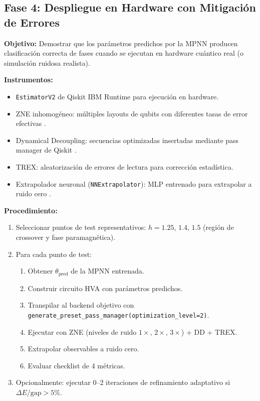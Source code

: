 \documentclass[11pt,a4paper,spanish]{book}
\begin{document}
\subsection{Fase 4: Despliegue en Hardware con Mitigación de Errores}

\textbf{Objetivo:} Demostrar que los parámetros predichos por la MPNN producen clasificación correcta de fases cuando se ejecutan en hardware cuántico real (o simulación ruidosa realista).

\textbf{Instrumentos:}
\begin{itemize}
    \item \texttt{EstimatorV2} de Qiskit IBM Runtime para ejecución en hardware.
    \item ZNE inhomogéneo: múltiples layouts de qubits con diferentes tasas de error efectivas \citep{uvarov2024}.
    \item Dynamical Decoupling: secuencias optimizadas insertadas mediante pass manager de Qiskit \citep{pokharel2025}.
    \item TREX: aleatorización de errores de lectura para corrección estadística.
    \item Extrapolador neuronal (\texttt{NNExtrapolator}): MLP entrenado para extrapolar a ruido cero \citep{sun2025}.
\end{itemize}

\textbf{Procedimiento:}
\begin{enumerate}
    \item Seleccionar puntos de test representativos: $h = 1.25$, $1.4$, $1.5$ (región de crossover y fase paramagnética).
    \item Para cada punto de test:
    \begin{enumerate}
        \item Obtener $\theta_{\text{pred}}$ de la MPNN entrenada.
        \item Construir circuito HVA con parámetros predichos.
        \item Transpilar al backend objetivo con \texttt{generate\_preset\_pass\_manager(optimization\_level=2)}.
        \item Ejecutar con ZNE (niveles de ruido $1\times$, $2\times$, $3\times$) + DD + TREX.
        \item Extrapolar observables a ruido cero.
        \item Evaluar checklist de 4 métricas.
    \end{enumerate}
    \item Opcionalmente: ejecutar 0--2 iteraciones de refinamiento adaptativo si $\Delta E/\text{gap} > 5\%$.
\end{enumerate}
\end{document}
